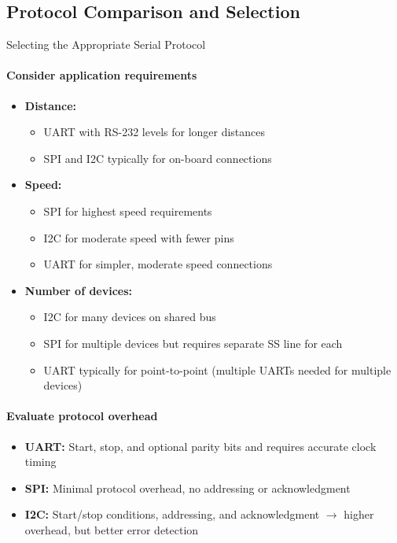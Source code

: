 \subsection{Protocol Comparison and Selection}

\begin{KR}{Selecting the Appropriate Serial Protocol}
\paragraph{Consider application requirements}
\begin{itemize}
    \item \textbf{Distance:}
    \begin{itemize}
        \item UART with RS-232 levels for longer distances
        \item SPI and I2C typically for on-board connections
    \end{itemize}
    \item \textbf{Speed:}
    \begin{itemize}
        \item SPI for highest speed requirements
        \item I2C for moderate speed with fewer pins
        \item UART for simpler, moderate speed connections
    \end{itemize}
    \item \textbf{Number of devices:}
    \begin{itemize}
        \item I2C for many devices on shared bus
        \item SPI for multiple devices but requires separate SS line for each
        \item UART typically for point-to-point (multiple UARTs needed for multiple devices)
    \end{itemize}
\end{itemize}

\paragraph{Evaluate protocol overhead}
\begin{itemize}
    \item \textbf{UART:} Start, stop, and optional parity bits and requires accurate clock timing
    \item \textbf{SPI:} Minimal protocol overhead, no addressing or acknowledgment
    \item \textbf{I2C:} Start/stop conditions, addressing, and acknowledgment $\rightarrow$ higher overhead, but better error detection
\end{itemize}


\end{KR}
